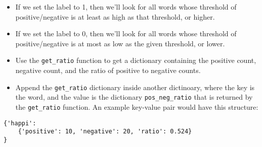\documentclass[11pt]{article}
\providecommand{\tightlist}{%
      \setlength{\itemsep}{0pt}\setlength{\parskip}{0pt}}
\begin{document}
\begin{itemize}
\tightlist
\item
  If we set the label to 1, then we'll look for all words whose
  threshold of positive/negative is at least as high as that threshold,
  or higher.
\item
  If we set the label to 0, then we'll look for all words whose
  threshold of positive/negative is at most as low as the given
  threshold, or lower.
\item
  Use the \texttt{get\_ratio} function to get a dictionary containing
  the positive count, negative count, and the ratio of positive to
  negative counts.
\item
  Append the \texttt{get\_ratio} dictionary inside another dictinoary,
  where the key is the word, and the value is the dictionary
  \texttt{pos\_neg\_ratio} that is returned by the \texttt{get\_ratio}
  function. An example key-value pair would have this structure:
\end{itemize}

\begin{verbatim}
{'happi':
    {'positive': 10, 'negative': 20, 'ratio': 0.524}
}
\end{verbatim}
\end{document}

